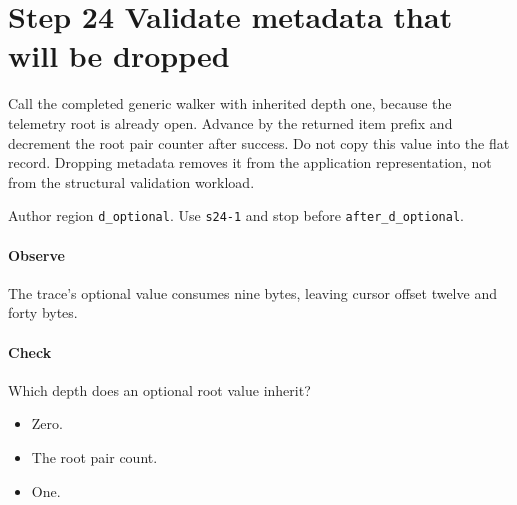 \section{Step 24 Validate metadata that will be dropped}\label{cbor-s24}
Call the completed generic walker with inherited depth one, because the telemetry root is already open. Advance by the returned item prefix and decrement the root pair counter after success. Do not copy this value into the flat record. Dropping metadata removes it from the application representation, not from the structural validation workload.

Author region \texttt{d\_optional}. Use \texttt{s24-1} and stop before \texttt{after\_d\_optional}.

\paragraph{Observe} The trace's optional value consumes nine bytes, leaving cursor offset twelve and forty bytes.

\paragraph{Check} Which depth does an optional root value inherit?
\begin{itemize}
\item[A.] Zero.
\item[B.] The root pair count.
\item[C.] One.
\end{itemize}
